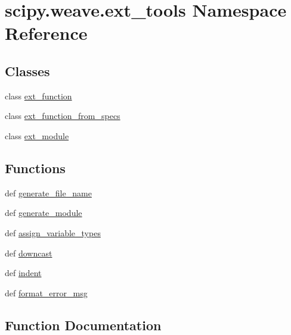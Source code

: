 \hypertarget{namespacescipy_1_1weave_1_1ext__tools}{}\section{scipy.\+weave.\+ext\+\_\+tools Namespace Reference}
\label{namespacescipy_1_1weave_1_1ext__tools}
\subsection*{Classes}
\begin{DoxyCompactItemize}
\item 
class \hyperlink{classscipy_1_1weave_1_1ext__tools_1_1ext__function}{ext\+\_\+function}
\item 
class \hyperlink{classscipy_1_1weave_1_1ext__tools_1_1ext__function__from__specs}{ext\+\_\+function\+\_\+from\+\_\+specs}
\item 
class \hyperlink{classscipy_1_1weave_1_1ext__tools_1_1ext__module}{ext\+\_\+module}
\end{DoxyCompactItemize}
\subsection*{Functions}
\begin{DoxyCompactItemize}
\item 
def \hyperlink{namespacescipy_1_1weave_1_1ext__tools_af781c1d802fbdbd9253926c821ce80a7}{generate\+\_\+file\+\_\+name}
\item 
def \hyperlink{namespacescipy_1_1weave_1_1ext__tools_a4fe37d697fde98aecb3b9f3717074b56}{generate\+\_\+module}
\item 
def \hyperlink{namespacescipy_1_1weave_1_1ext__tools_a4ff9a7de57108771d06fcbd9c08ba9d3}{assign\+\_\+variable\+\_\+types}
\item 
def \hyperlink{namespacescipy_1_1weave_1_1ext__tools_a1708085f80279f1618a7032a15a058c1}{downcast}
\item 
def \hyperlink{namespacescipy_1_1weave_1_1ext__tools_ae76fdb5baab68bbed23e07e0caf0f84d}{indent}
\item 
def \hyperlink{namespacescipy_1_1weave_1_1ext__tools_a012a677a22cc0a72d5cd742785f7c852}{format\+\_\+error\+\_\+msg}
\end{DoxyCompactItemize}


\subsection{Function Documentation}
\hypertarget{namespacescipy_1_1weave_1_1ext__tools_a4ff9a7de57108771d06fcbd9c08ba9d3}{}
